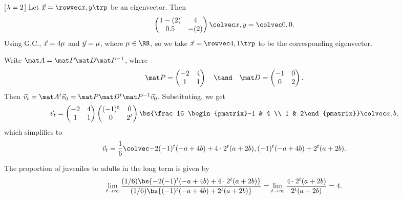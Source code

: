 \begin{solution}
\begin{ppart}
\begin{psubpart}
            [$\lambda = 2$] Let $\vec x = \cveciix{x}{y}$ be an eigenvector. Then \[\begin{pmatrix}1-(2) & 4 \\ 0.5 & -(2)\end{pmatrix} \cvecii{x}{y} = \cvecii00.\] Using G.C., $\vec x = 4\mu$ and $\vec y = \mu$, where $\m \in \RR$, so we take $\vec x = \cveciix{4}{1}$ to be the corresponding eigenvector.
        \end{psubpart}
        \begin{psubpart}
            Write $\mat A = \mat P \mat D \mat P^{-1}$, where \[\mat P = \begin{pmatrix}-2 & 4 \\ 1 & 1\end{pmatrix} \quad \tand \quad \mat D = \begin{pmatrix}-1 & 0 \\ 0 & 2\end{pmatrix}.\] Then $\vec v_t = \mat A^t \vec v_0 = \mat P \mat D^t \mat P^{-1} \vec v_0$. Substituting, we get \[\vec v_t = \begin{pmatrix}-2 & 4 \\ 1 & 1\end{pmatrix} \begin{pmatrix}(-1)^t & 0 \\ 0 & 2^t\end{pmatrix} \bs{\frac16 \begin{pmatrix}-1 & 4 \\ 1 & 2\end{pmatrix}} \cvecii{a}{b},\] which simplifies to \[\vec v_t = \frac16 \cvecii{-2(-1)^t (-a+4b) + 4\cdot2^t(a+2b)}{(-1)^t (-a+4b) + 2^t(a+2b)}.\]
        \end{psubpart}
        \begin{psubpart}
            The proportion of juveniles to adults in the long term is given by \[\lim_{t \to \infty} \frac{(1/6)\bs{-2(-1)^t (-a+4b) + 4\cdot2^t(a+2b)}}{(1/6) \bs{(-1)^t (-a+4b) + 2^t(a+2b)}} = \lim_{t \to \infty} \frac{4\cdot2^t(a+2b)}{2^t(a+2b)} = 4.\]
        \end{psubpart}
    \end{ppart}
\end{solution}
